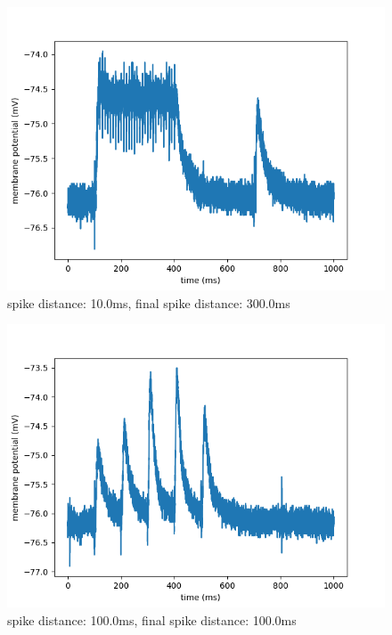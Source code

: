\documentclass[10pt,a4paper]{scrartcl}
\begin{document}
\begin{figure} [ht]
\begin{center}
\label{fig:abb14}
\caption{spike distance: 10.0ms, final spike distance: 300.0ms}
\includegraphics[scale=0.35]{pictures/final_spike_variation_3.pdf} 
\end{center}
\end{figure}

\begin{figure} [ht]
\begin{center}
\label{fig:abb15}
\caption{spike distance: 100.0ms, final spike distance: 100.0ms}
\includegraphics[scale=0.35]{pictures/final_spike_variation_4.pdf} 
\end{center}
\end{figure}
\end{document}
